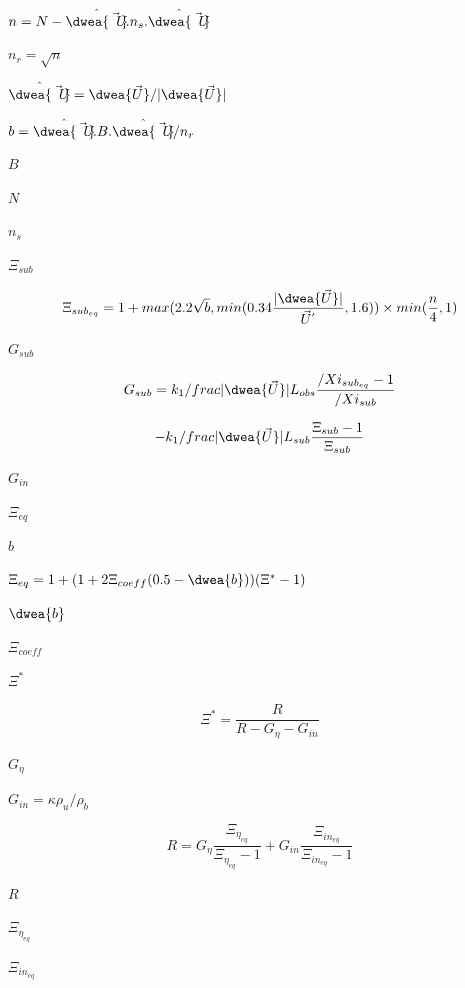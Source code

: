 \documentclass{article}
\begin{document}
$ n = N - \hat{\dwea{\vec{U}}}.n_{s}.\hat{\dwea{\vec{U}}} $
\pagebreak

$ n_{r} = \sqrt{n} $
\pagebreak

$ \hat{\dwea{\vec{U}}} = \dwea{\vec{U}} / \vert \dwea{\vec{U}}
    \vert $
\pagebreak

$ b = \hat{\dwea{\vec{U}}}.B.\hat{\dwea{\vec{U}}} / n_{r} $
\pagebreak

$ B $
\pagebreak

$ N $
\pagebreak

$  n_{s} $
\pagebreak

$ \Xi_{sub} $
\pagebreak

\[
    \Xi_{{sub}_{eq}} =
        1 + max(2.2 \sqrt{b}, min(0.34 \frac{\vert \dwea{\vec{U}}
        \vert}{{\vec{U}}^{'}}, 1.6)) \times min(\frac{n}{4}, 1)
\]
\pagebreak

$ G_{sub} $
\pagebreak

\[
    G_{sub} = k_{1} /frac{\vert \dwea{\vec{U}} \vert}{L_{obs}}
             \frac{/Xi_{{sub}_{eq}}-1}{/Xi_{sub}}
\]
\pagebreak

\[
    - k_{1} /frac{\vert \dwea{\vec{U}} \vert}{L_{sub}}
    \frac{\Xi_{sub}-1}{\Xi_{sub}}
\]
\pagebreak

$ G_{in} $
\pagebreak

$\Xi_{eq}$
\pagebreak

$ b $
\pagebreak

$\Xi_{eq} = 1 + (1 + 2\Xi_{coeff}(0.5 - \dwea{b}))(\Xi^* - 1)$
\pagebreak

$ \dwea{b} $
\pagebreak

$ \Xi_{coeff} $
\pagebreak

$ \Xi^* $
\pagebreak

\[
        \Xi^* = \frac {R}{R - G_\eta - G_{in}}
    \]
\pagebreak

$ G_\eta $
\pagebreak

$ G_{in} = \kappa \rho_{u}/\rho_{b} $
\pagebreak

\[
        R = G_\eta \frac{\Xi_{\eta_{eq}}}{\Xi_{\eta_{eq}} - 1}
          + G_{in} \frac{\Xi_{{in}_{eq}}}{\Xi_{{in}_{eq}} - 1}
    \]
\pagebreak

$ R $
\pagebreak

$ \Xi_{\eta_{eq}} $
\pagebreak

$ \Xi_{{in}_{eq}} $
\pagebreak
\end{document}
